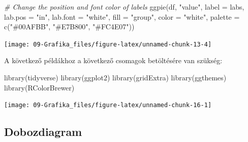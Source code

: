 \documentclass[
]{book}
\newenvironment{Shaded}{\begin{snugshade}}{\end{snugshade}}
\newcommand{\AttributeTok}[1]{\textcolor[rgb]{0.77,0.63,0.00}{#1}}
\newcommand{\CommentTok}[1]{\textcolor[rgb]{0.56,0.35,0.01}{\textit{#1}}}
\newcommand{\FunctionTok}[1]{\textcolor[rgb]{0.00,0.00,0.00}{#1}}
\newcommand{\NormalTok}[1]{#1}
\newcommand{\StringTok}[1]{\textcolor[rgb]{0.31,0.60,0.02}{#1}}
\begin{document}
\begin{Shaded}
\begin{Highlighting}[]

\CommentTok{\# Change the position and font color of labels}
\FunctionTok{ggpie}\NormalTok{(df, }\StringTok{"value"}\NormalTok{, }\AttributeTok{label =}\NormalTok{ labs,}
   \AttributeTok{lab.pos =} \StringTok{"in"}\NormalTok{, }\AttributeTok{lab.font =} \StringTok{"white"}\NormalTok{,}
   \AttributeTok{fill =} \StringTok{"group"}\NormalTok{, }\AttributeTok{color =} \StringTok{"white"}\NormalTok{,}
   \AttributeTok{palette =} \FunctionTok{c}\NormalTok{(}\StringTok{"\#00AFBB"}\NormalTok{, }\StringTok{"\#E7B800"}\NormalTok{, }\StringTok{"\#FC4E07"}\NormalTok{))}
\end{Highlighting}
\end{Shaded}

\begin{center}\texttt{[image: 09-Grafika\_files/figure-latex/unnamed-chunk-13-4]} \end{center}

A következő példákhoz a következő csomagok betöltésére van szükség:

\begin{Shaded}
\begin{Highlighting}[]
\FunctionTok{library}\NormalTok{(tidyverse)}
\FunctionTok{library}\NormalTok{(ggplot2)}
\FunctionTok{library}\NormalTok{(gridExtra)}
\FunctionTok{library}\NormalTok{(ggthemes)}
\FunctionTok{library}\NormalTok{(RColorBrewer)}
\end{Highlighting}
\end{Shaded}

\begin{center}\texttt{[image: 09-Grafika\_files/figure-latex/unnamed-chunk-16-1]} \end{center}

\hypertarget{dobozdiagram}{%
\subsection{Dobozdiagram}\label{dobozdiagram}}
\end{document}
